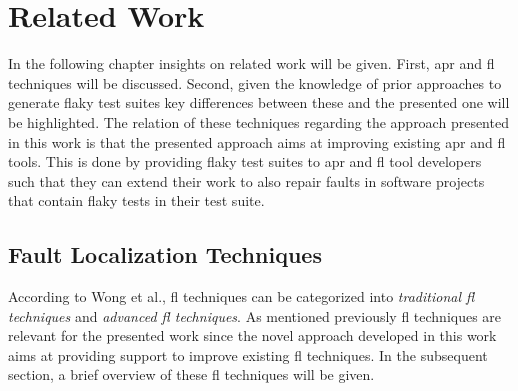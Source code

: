 \documentclass[
fancyheadings, %
%
%
]{stsreprt}
\begin{document}
\chapter{Related Work}\label{ch:rel_work}
In the following chapter insights on related work will be given. 
First, \acrlong{apr} and \acrlong{fl} techniques will be discussed. 
Second,  given the knowledge of prior approaches to generate flaky test suites key differences between these and the presented one will be highlighted. 
The relation of these techniques regarding the approach presented in this work is that the presented approach aims at improving existing \acrshort{apr} and \acrshort{fl} tools. 
This is done by providing flaky test suites to \acrshort{apr} and \acrshort{fl} tool developers such that they can extend their work to also repair faults in software projects that contain flaky tests in their test suite. 

\section{Fault Localization Techniques}
According to Wong et al., \cite{fault-loc-survey:2016} \acrshort{fl} techniques can be categorized into \textit{traditional \acrshort{fl} techniques} and \textit{advanced \acrshort{fl} techniques}. 
As mentioned previously \acrshort{fl} techniques are relevant for the presented work since the novel approach developed in this work aims at providing support to improve existing \acrshort{fl} techniques. 
In the subsequent section, a brief overview of these \acrshort{fl} techniques will be given. 
\end{document}
